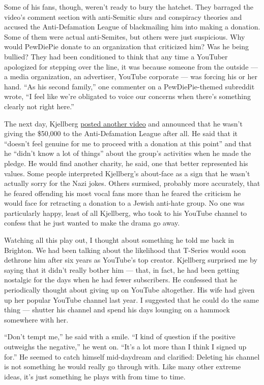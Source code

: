 Some of his fans, though, weren't ready to bury the hatchet. They
barraged the video's comment section with anti-Semitic slurs and
conspiracy theories and accused the Anti-Defamation League of
blackmailing him into making a donation. Some of them were actual
anti-Semites, but others were just suspicious. Why would PewDiePie
donate to an organization that criticized him? Was he being bullied?
They had been conditioned to think that any time a YouTuber apologized
for stepping over the line, it was because someone from the outside ---
a media organization, an advertiser, YouTube corporate --- was forcing
his or her hand. ``As his second family,'' one commenter on a
PewDiePie-themed subreddit wrote, ``I feel like we're obligated to voice
our concerns when there's something clearly not right here.''

The next day, Kjellberg
\href{https://www.youtube.com/watch?v=PbfX3ZyHLJg}{posted another video}
and announced that he wasn't giving the \$50,000 to the Anti-Defamation
League after all. He said that it ``doesn't feel genuine for me to
proceed with a donation at this point'' and that he ``didn't know a lot
of things'' about the group's activities when he made the pledge. He
would find another charity, he said, one that better represented his
values. Some people interpreted Kjellberg's about-face as a sign that he
wasn't actually sorry for the Nazi jokes. Others surmised, probably more
accurately, that he feared offending his most vocal fans more than he
feared the criticism he would face for retracting a donation to a Jewish
anti-hate group. No one was particularly happy, least of all Kjellberg,
who took to his YouTube channel to confess that he just wanted to make
the drama go away.

Watching all this play out, I thought about something he told me back in
Brighton. We had been talking about the likelihood that T-Series would
soon dethrone him after six years as YouTube's top creator. Kjellberg
surprised me by saying that it didn't really bother him --- that, in
fact, he had been getting nostalgic for the days when he had fewer
subscribers. He confessed that he periodically thought about giving up
on YouTube altogether. His wife had given up her popular YouTube channel
last year. I suggested that he could do the same thing --- shutter his
channel and spend his days lounging on a hammock somewhere with her.

``Don't tempt me,'' he said with a smile. ``I kind of question if the
positive outweighs the negative,'' he went on. ``It's a lot more than I
think I signed up for.'' He seemed to catch himself mid-daydream and
clarified: Deleting his channel is not something he would really go
through with. Like many other extreme ideas, it's just something he
plays with from time to time.

